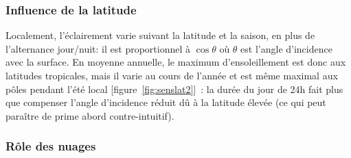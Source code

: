 \sk
\subsubsection{Influence de la latitude}

\sk
Localement, l'éclairement varie suivant la latitude et la saison, en plus de l'alternance jour/nuit: il est proportionnel à $\cos\theta$ où $\theta$ est l'angle d'incidence avec la surface.
En moyenne annuelle, le maximum d'ensoleillement est donc aux latitudes tropicales, mais il varie au cours de l'année et est même maximal aux pôles pendant l'été local [figure~\ref{fig:senslat2}]~: la durée du jour de 24h fait plus que compenser l'angle d'incidence réduit dû à la latitude élevée (ce qui peut paraître de prime abord contre-intuitif).

\sk
\subsubsection{Rôle des nuages}

